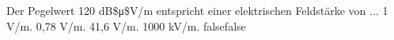     {Der Pegelwert 120 dB\$μ\$V/m entspricht einer elektrischen Feldstärke von ...}
    {1 V/m.}
    {0,78 V/m.}
    {41,6 V/m.}
    {1000 kV/m.}
    {false}{false}